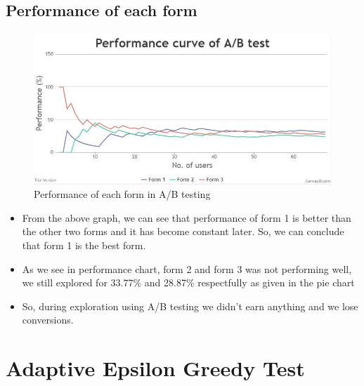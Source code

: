 \documentclass[12pt]{report}
\begin{document}
\subsection{Performance of each form}
\begin{figure}[H]
\includegraphics[scale=0.8]{performanceabtest.jpg}
\caption{Performance of each form in A/B testing}
\end{figure}

\begin{itemize}
\item From the above graph, we can see that performance of form 1 is better than the other two forms and it has become constant later. So, we can conclude that form 1 is the best form.
\item As we see in performance chart, form 2 and form 3 was not performing well, we still explored for 33.77\% and 28.87\% respectfully as given in the pie chart
\item So, during exploration using A/B testing we didn’t earn anything and we lose conversions.
\end{itemize}
\newpage

\section{Adaptive Epsilon Greedy Test}
\end{document}
